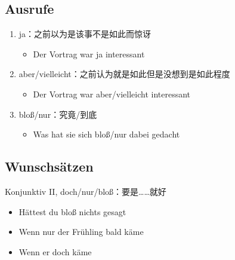 \documentclass[UTF8]{report}
\begin{document}
\subsection{Ausrufe}
\begin{enumerate}
    \item ja：之前以为是该事不是如此而惊讶
    \begin{itemize}
        \item Der Vortrag war ja interessant
    \end{itemize}
    \item aber/vielleicht：之前认为就是如此但是没想到是如此程度
    \begin{itemize}
        \item Der Vortrag war aber/vielleicht interessant
    \end{itemize}
    \item bloß/nur：究竟/到底
    \begin{itemize}
        \item Was hat sie sich bloß/nur dabei gedacht
    \end{itemize}
\end{enumerate}

\subsection{Wunschsätzen}
Konjunktiv II, doch/nur/bloß：要是……就好
\begin{itemize}
    \item Hättest du bloß nichts gesagt
    \item Wenn nur der Frühling bald käme
    \item Wenn er doch käme
\end{itemize}
\end{document}

